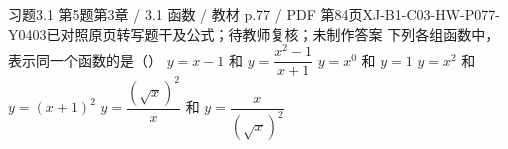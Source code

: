 \par\noindent\begin{minipage}{\linewidth}
\begin{bankitem}{习题3.1 第5题}{第3章 / 3.1 函数 / 教材 p.77 / PDF 第84页}{XJ-B1-C03-HW-P077-Y0403}{已对照原页转写题干及公式；待教师复核；未制作答案}
下列各组函数中，表示同一个函数的是（\quad）
$y=x-1$ 和 $y=\dfrac{x^2-1}{x+1}$
$y=x^0$ 和 $y=1$
$y=x^2$ 和 $y=(x+1)^2$
$y=\dfrac{(\sqrt x)^2}x$ 和 $y=\dfrac x{(\sqrt x)^2}$
\end{bankitem}
\end{minipage}\par\medskip
